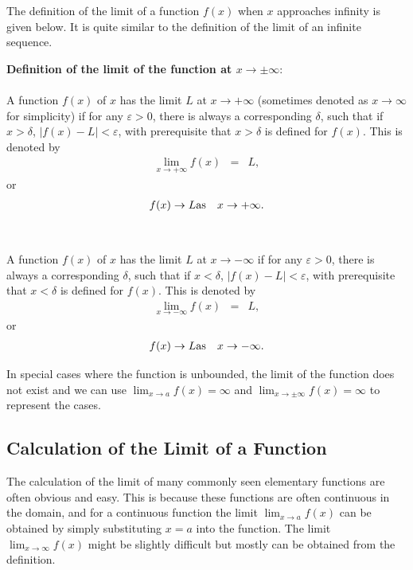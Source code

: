 The definition of the limit of a function $f(x)$ when $x$ approaches infinity is given below. It is quite similar to the definition of the limit of an infinite sequence.
\begin{VF}
\textbf{Definition of the limit of the function at $x\rightarrow \pm \infty$}:
\\
\\
\noindent A function $f(x)$ of $x$ has the limit $L$ at $x \rightarrow +\infty$ (sometimes denoted as $x \rightarrow \infty$ for simplicity) if for any $\varepsilon > 0$, there is always a corresponding $\delta$, such that if $x > \delta$, $|f(x)-L| < \varepsilon$, with prerequisite that $x > \delta$ is defined for $f(x)$. This is denoted by
\begin{eqnarray}
   \lim_{x\rightarrow +\infty} f(x) &=& L, \nonumber
\end{eqnarray}
or
\begin{eqnarray}
  f(x) \rightarrow L & \textup{as} & x \rightarrow +\infty. \nonumber
\end{eqnarray}
\\
\\
\noindent A function $f(x)$ of $x$ has the limit $L$ at $x \rightarrow -\infty$ if for any $\varepsilon > 0$, there is always a corresponding $\delta$, such that if $x < \delta$, $|f(x)-L| < \varepsilon$, with prerequisite that $x < \delta$ is defined for $f(x)$. This is denoted by
\begin{eqnarray}
   \lim_{x\rightarrow -\infty} f(x) &=& L, \nonumber
\end{eqnarray}
or
\begin{eqnarray}
  f(x) \rightarrow L & \textup{as} & x \rightarrow -\infty. \nonumber
\end{eqnarray}
\end{VF}

In special cases where the function is unbounded, the limit of the function does not exist and we can use $\lim_{x\rightarrow a}f(x) =  \infty$ and $\lim_{x\rightarrow \pm \infty}f(x) = \infty$ to represent the cases.

\subsection{Calculation of the Limit of a Function} \label{ch1subsec:calculationlimitfunction}

The calculation of the limit of many commonly seen elementary functions are often obvious and easy. This is because these functions are often continuous in the domain, and for a continuous function the limit $\lim_{x\rightarrow a}f(x)$ can be obtained by simply substituting $x=a$ into the function. The limit $\lim_{x\rightarrow \infty}f(x)$ might be slightly difficult but mostly can be obtained from the definition.

